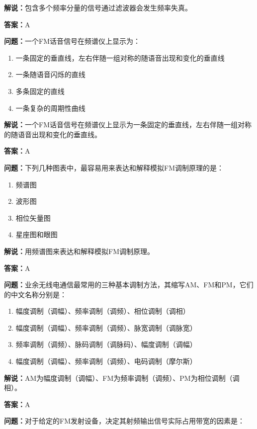\textbf{解说：}包含多个频率分量的信号通过滤波器会发生频率失真。%

\textbf{答案：}A

\textbf{问题：}一个FM话音信号在频谱仪上显示为：

\begin{enumerate}[label=\Alph*), leftmargin=1cm]
	\item 一条固定的垂直线，左右伴随一组对称的随语音出现和变化的垂直线
	\item 一条随语音闪烁的直线
	\item 多条固定的直线
	\item 一条复杂的周期性曲线
\end{enumerate}

\textbf{解说：}一个FM话音信号在频谱仪上显示为一条固定的垂直线，左右伴随一组对称的随语音出现和变化的垂直线。%

\textbf{答案：}A

\textbf{问题：}下列几种图表中，最容易用来表达和解释模拟FM调制原理的是：

\begin{enumerate}[label=\Alph*), leftmargin=1cm]
	\item 频谱图
	\item 波形图
	\item 相位矢量图
	\item 星座图和眼图
\end{enumerate}

\textbf{解说：}用频谱图来表达和解释模拟FM调制原理。%

\textbf{答案：}A

\textbf{问题：}业余无线电通信最常用的三种基本调制方法，其缩写AM、FM和PM，它们的中文名称分别是：

\begin{enumerate}[label=\Alph*), leftmargin=1cm]
	\item 幅度调制（调幅）、频率调制（调频）、相位调制（调相）
	\item 幅度调制（调幅）、频率调制（调频）、脉宽调制（调脉宽）
	\item 频率调制（调频）、脉码调制（调脉码）、幅度调制（调幅）
	\item 幅度调制（调幅）、频率调制（调频）、电码调制（摩尔斯）
\end{enumerate}

\textbf{解说：}AM为幅度调制（调幅）、FM为频率调制（调频）、PM为相位调制（调相）。%

\textbf{答案：}A

\textbf{问题：}对于给定的FM发射设备，决定其射频输出信号实际占用带宽的因素是：

